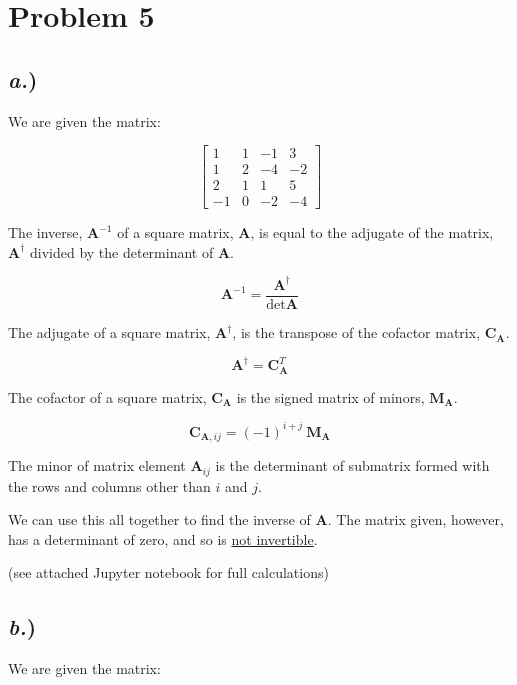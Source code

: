 \documentclass{article}
\begin{document}

\section*{Problem 5}

\subsection*{\textit{a.})}

We are given the matrix:

$$\begin{bmatrix}
1 	&	1	&	-1	&	3	\\
1	&	2	&	-4	&	-2	\\
2	&	1	&	1	&	5	\\
-1	&	0	&	-2	&	-4	\end{bmatrix}$$

The inverse, $\textbf{A}^{-1}$ of a square matrix, $\textbf{A}$,  is equal to the adjugate of the matrix, $\textbf{A}^{\dagger}$ divided by the determinant of $\textbf{A}$. 

$$ \textbf{A}^{-1} = \frac{\textbf{A}^{\dagger}}{\det{\textbf{A}}} $$

The adjugate of a square matrix, $\textbf{A}^{\dagger}$, is the transpose of the cofactor matrix, $\textbf{C}_{\textbf{A}}$.

$$ \textbf{A}^{\dagger} = \textbf{C}_{\textbf{A}}^T $$

The cofactor of a square matrix, $\textbf{C}_{\textbf{A}}$ is the signed matrix of minors, $\textbf{M}_{\textbf{A}}$.

$$ \textbf{C}_{\textbf{A},ij} = (-1)^{i+j} \ \textbf{M}_{\textbf{A}} $$

The minor of matrix element $\textbf{A}_{ij}$ is the determinant of submatrix formed with the rows and columns other than $i$ and $j$.

We can use this all together to find the inverse of $\textbf{A}$. The matrix given, however, has a determinant of zero, and so is \underline{not invertible}.

(see attached Jupyter notebook for full calculations)


\subsection*{\textit{b.})}

We are given the matrix:
\end{document}
